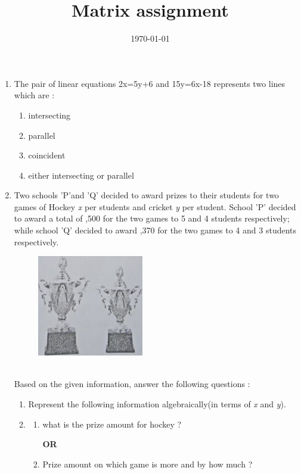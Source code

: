 \documentclass[12pt,-letter paper]{article}
\title{Matrix assignment}
\date{\today}
\begin{document}
\begin{enumerate}
	\item The pair of linear equations 2x=5y+6 and 15y=6x-18 represents two lines which are : 
\begin{enumerate}
    \item intersecting
    \item parallel
    \item coincident
    \item either intersecting or parallel
\end{enumerate}
\item Two schools 'P'and 'Q' decided to award prizes to their students for two games of Hockey \rupee \textit{x} per students and cricket \rupee \textit{y} per student. School 'P'
decided to award a total of ,500 for the two games to 5 and 4 students respectively; while school 'Q' decided to award ,370 for the two games to 4 and 3 students respectively.
\begin{figure}
    \centering
    \includegraphics{math.png}

\caption{}
\end{figure}
\\Based on the given information, answer the following questions :
\begin{enumerate}[label=(\roman*)]
    \item Represent the following information algebraically(in terms of \textit{x} and \textit{y}).
    \item\begin{enumerate}[label=(\alph*)]
\item what is the prize amount for hockey ?
    \begin{center}{\textbf{OR}}
\end{center}
\item Prize amount on which game is more and by how much ?
    

\end{enumerate}
\end{enumerate}
\end{enumerate}
\end{document}
